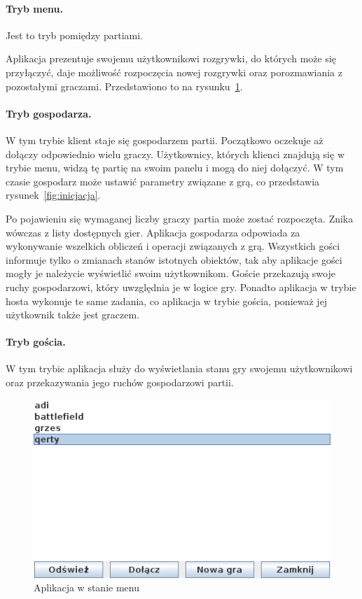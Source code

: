 \documentclass[a4paper, 12pt]{article}
\begin{document}
\paragraph{Tryb menu.} Jest to tryb pomiędzy partiami.

Aplikacja prezentuje swojemu użytkownikowi rozgrywki, do których może się przyłączyć, daje możliwość rozpoczęcia nowej rozgrywki oraz porozmawiania z pozostałymi graczami. Przedstawiono to na rysunku~\ref{fig:menu}. 

\paragraph{Tryb gospodarza.} W tym trybie klient staje się gospodarzem partii. Początkowo oczekuje aż dołączy odpowiednio wielu graczy. Użytkownicy, których klienci znajdują się w trybie menu, widzą tę partię na swoim panelu i mogą do niej dołączyć. W tym czasie gospodarz może ustawić parametry związane z grą, co przedstawia rysunek~\ref{fig:inicjacja}.


Po pojawieniu się wymaganej liczby graczy partia może zostać rozpoczęta. Znika wówczas z listy dostępnych gier. Aplikacja gospodarza odpowiada za wykonywanie wszelkich obliczeń i operacji związanych z grą. Wszystkich gości informuje tylko o zmianach stanów istotnych obiektów, tak aby aplikacje gości mogły je należycie wyświetlić swoim użytkownikom. Goście przekazują swoje ruchy gospodarzowi, który uwzględnia je w logice gry. Ponadto aplikacja w trybie hosta wykonuje te same zadania, co aplikacja w trybie gościa, ponieważ jej użytkownik także jest graczem.

\paragraph{Tryb gościa.} W tym trybie aplikacja służy do wyświetlania stanu gry swojemu użytkownikowi oraz przekazywania jego ruchów gospodarzowi partii.


\begin{figure}
\centering
\includegraphics[scale=0.8]{rysunki/menu.png}
\caption{Aplikacja w stanie menu}
\label{fig:menu}
\end{figure}
\end{document}
